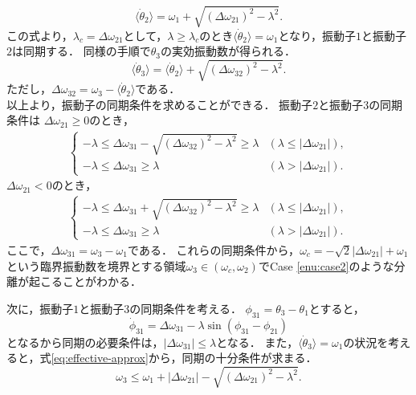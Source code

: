 \documentclass[../main]{subfiles}
\begin{document}
\begin{equation}
    \langle\dot{\theta}_2\rangle=\omega_1+\sqrt{(\Delta\omega_{21})^2-\lambda^2}.
\end{equation}
この式より，$\lambda_c=\Delta\omega_{21}$として，$\lambda\geq\lambda_c$のとき$\langle\dot{\theta}_2\rangle=\omega_1$となり，振動子$1$と振動子$2$は同期する．
同様の手順で$\theta_3$の実効振動数が得られる．
\begin{equation}
    \label{eq:effective-approx}
    \langle\dot{\theta}_3\rangle=\langle\dot{\theta}_2\rangle+\sqrt{(\Delta\omega_{32})^2-\lambda^2}.
\end{equation}
ただし，$\Delta\omega_{32}=\omega_3-\langle\dot{\theta}_2\rangle$である．\\
以上より，振動子の同期条件を求めることができる．
振動子$2$と振動子$3$の同期条件は
$\Delta\omega_{21}\geq 0$のとき，
\begin{align}
    \begin{cases}
        -\lambda\leq\Delta\omega_{31}-\sqrt{(\Delta\omega_{32})^2-\lambda^2}\geq\lambda & (\lambda\leq|\Delta\omega_{21}|),\\
        -\lambda\leq\Delta\omega_{31}\geq\lambda & (\lambda>|\Delta\omega_{21}|).
    \end{cases}
\end{align}
$\Delta\omega_{21}< 0$のとき，
\begin{align}
    \begin{cases}
        -\lambda\leq\Delta\omega_{31}+\sqrt{(\Delta\omega_{32})^2-\lambda^2}\geq\lambda & (\lambda\leq|\Delta\omega_{21}|),\\
        -\lambda\leq\Delta\omega_{31}\geq\lambda & (\lambda>|\Delta\omega_{21}|).
    \end{cases}
\end{align}
ここで，$\Delta\omega_{31}=\omega_3-\omega_1$である．
これらの同期条件から，$\omega_c=-\sqrt{2}|\Delta\omega_{21}|+\omega_1$という臨界振動数を境界とする領域$\omega_3\in(\omega_c,\omega_2)$でCase \ref{enu:case2}のような分離が起こることがわかる．

次に，振動子$1$と振動子$3$の同期条件を考える．
$\phi_{31}=\theta_3-\theta_1$とすると，
\begin{equation}
    \dot{\phi}_{31}=\Delta\omega_{31}-\lambda\sin(\phi_{31}-\phi_{21})
\end{equation}
となるから同期の必要条件は，$|\Delta\omega_{31}|\leq \lambda$となる．
また，$\langle\dot{\theta}_3\rangle=\omega_1$の状況を考えると，式\eqref{eq:effective-approx}から，同期の十分条件が求まる．
\begin{equation}
    \omega_3\leq\omega_1+|\Delta\omega_{21}|-\sqrt{(\Delta\omega_{21})^2-\lambda^2}.
\end{equation}
\end{document}
